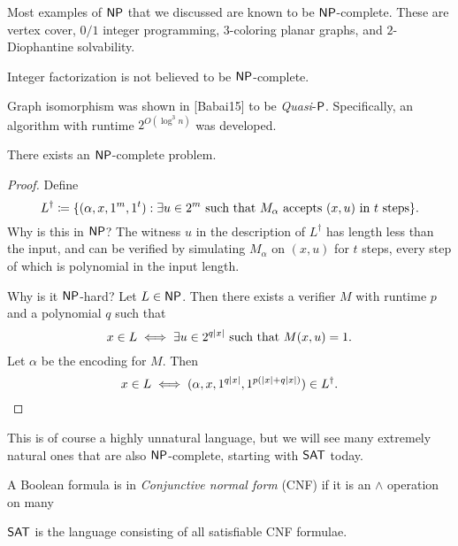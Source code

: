 Most examples of $\NP$ that we discussed are known to be $\NP$-complete.
These are vertex cover, $0/1$ integer programming,
$3$-coloring planar graphs, and $2$-Diophantine solvability.

Integer factorization is not believed to be $\NP$-complete.

Graph isomorphism was shown in [Babai15] to be \emph{Quasi}-$\P$.
Specifically, an algorithm with runtime $2^{O(\log^3 n)}$ was developed.

\begin{theorem}
    There exists an $\NP$-complete problem.
\end{theorem}
\begin{proof}
    Define \[
        L^\dagger \coloneq \set{(\alpha, x, 1^m, 1^t) : \exists u \in 2^m
            \text{ such that } M_\alpha \text{ accepts } (x, u) \text{ in } t \text{ steps}}.
    \] Why is this in $\NP$?
    The witness $u$ in the description of $L^\dagger$ has length less than
    the input, and can be verified by simulating $M_\alpha$ on
    $(x, u)$ for $t$ steps, every step of which is polynomial in the
    input length.

    Why is it $\NP$-hard?
    Let $L \in \NP$.
    Then there exists a verifier $M$ with runtime $p$ and a polynomial $q$
    such that \[
        x \in L \iff \exists u \in 2^{q\abs{x}} \text{ such that }
            M(x, u) = 1.
    \] Let $\alpha$ be the encoding for $M$.
    Then \[
        x \in L \iff (\alpha, x, 1^{q\abs{x}}, 1^{p(\abs{x} + q\abs{x})})
            \in L^\dagger.
    \]
\end{proof}
This is of course a highly unnatural language, but we will see many
extremely natural ones that are also $\NP$-complete,
starting with $\SAT$ today.

\begin{definition} \label{def:cnf}
    A Boolean formula is in \emph{Conjunctive normal form} (CNF) if it is
    an $\land$ operation on many
\end{definition}

\begin{definition}[\SAT] \label{def:sat}
    $\SAT$ is the language consisting of all satisfiable CNF formulae.
\end{definition}

